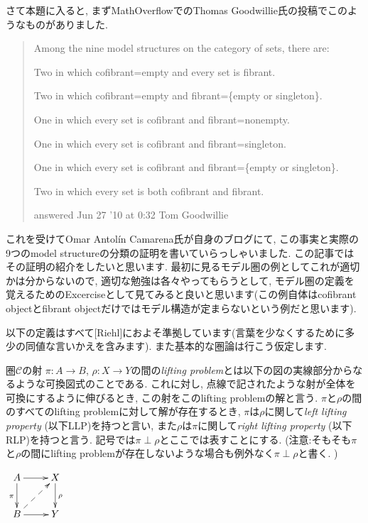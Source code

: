 \documentclass[. /main]{subfiles}
\begin{document}
さて本題に入ると, まずMathOverflowでのThomas Goodwillie氏の投稿でこのようなものがありました\cite{Goodwillie}.
\begin{quote}

Among the nine model structures on the category of sets,  there are:

Two in which cofibrant=empty and every set is fibrant. 

Two in which cofibrant=empty and fibrant=\{empty or singleton\}. 

One in which every set is cofibrant and fibrant=nonempty. 

One in which every set is cofibrant and fibrant=singleton. 

One in which every set is cofibrant and fibrant=\{empty or singleton\}. 

Two in which every set is both cofibrant and fibrant. 

\begin{flushright} answered Jun 27 '10 at 0:32
Tom Goodwillie \end{flushright}
\end{quote}

これを受けてOmar Antolín Camarena氏が自身のブログにて, この事実と実際の9つのmodel structureの分類の証明を書いていらっしゃいました\cite{Camarena}. この記事ではその証明の紹介をしたいと思います. 最初に見るモデル圏の例としてこれが適切かは分からないので, 適切な勉強は各々やってもらうとして, モデル圏の定義を覚えるためのExcerciseとして見てみると良いと思います(この例自体はcofibrant objectとfibrant objectだけではモデル構造が定まらないという例だと思います). 

以下の定義はすべて[Riehl]におよそ準拠しています(言葉を少なくするために多少の同値な言いかえを含みます). また基本的な圏論は行こう仮定します.
\begin{momodefi}
圏$\mathcal{C}$の射 $\pi \colon A \to B$, $\rho \colon X \to Y$の間の{\it lifting problem}とは以下の図の実線部分からなるような可換図式のことである. これに対し, 点線で記されたような射が全体を可換にするように伸びるとき, この射をこのlifting problemの解と言う. $\pi$と$\rho$の間のすべてのlifting problemに対して解が存在するとき, $\pi$は$\rho$に関して{\it left lifting property} (以下LLP)を持つと言い, また$\rho$は$\pi$に関して{\it right lifting property} (以下RLP)を持つと言う. 記号では$\pi \perp \rho$とここでは表すことにする. (注意:そもそも$\pi$と$\rho$の間にlifting problemが存在しないような場合も例外なく$\pi \perp \rho$と書く. )
\begin{center}
$\xymatrix{
A \ar[d]_{\pi} \ar[r] \ar@{}[dr] & X \ar[d]^{\rho} \\
B \ar@{-->}[ru] \ar[r] & Y \\
}$
\end{center}
\end{momodefi}
\end{document}
